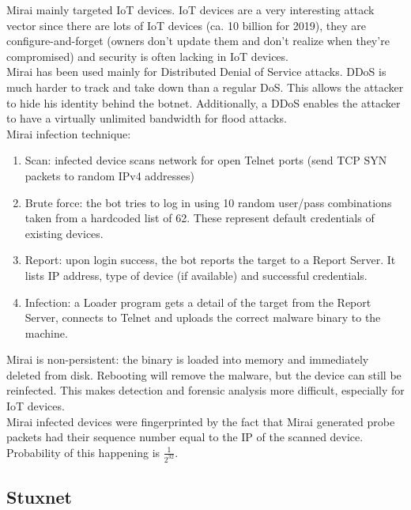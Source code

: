 \documentclass[11pt,oneside,a4paper]{article}
\begin{document}
Mirai mainly targeted IoT devices. IoT devices are a very interesting attack vector since there are lots of IoT devices (ca. 10 billion for 2019), they are configure-and-forget (owners don't update them and don't realize when they're compromised) and security is often lacking in IoT devices.\\
Mirai has been used mainly for Distributed Denial of Service attacks. DDoS is much harder to track and take down than a regular DoS. This allows the attacker to hide his identity behind the botnet. Additionally, a DDoS enables the attacker to have a virtually unlimited bandwidth for flood attacks.\\
Mirai infection technique:

\vspace{-\topsep}
\begin{enumerate}
	\setlength{\itemsep}{0pt}
	\setlength{\parskip}{0pt}
	\item Scan: infected device scans network for open Telnet ports (send TCP SYN packets to random IPv4 addresses)
	\item Brute force: the bot tries to log in using 10 random user/pass combinations taken from
	a hardcoded list of 62. These represent default credentials of existing devices.
	\item Report: upon login success, the bot reports the target to a Report Server. It lists IP
	address, type of device (if available) and successful credentials.
	\item Infection: a Loader program gets a detail of the target from the Report Server, connects
	to Telnet and uploads the correct malware binary to the machine.
\end{enumerate}
\vspace{-\topsep}

Mirai is non-persistent: the binary is loaded into memory and immediately deleted from disk. Rebooting will remove the malware, but the device can still be reinfected. This makes detection and forensic analysis more difficult, especially for IoT devices.\\
Mirai infected devices were fingerprinted by the fact that Mirai generated probe packets had their sequence number equal to the IP of the scanned device. Probability of this happening is $\frac{1}{2^{32}}$.

\subsection{Stuxnet}
\end{document}

